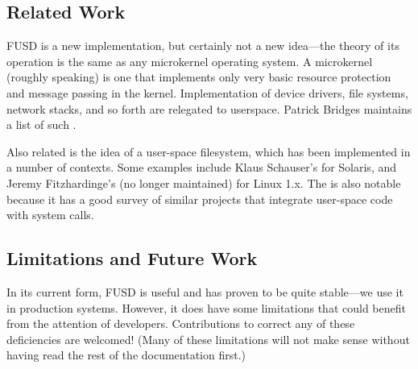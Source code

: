 \documentclass{article}
\begin{document}
\subsection{Related Work}

FUSD is a new implementation, but certainly not a new idea---the
theory of its operation is the same as any microkernel operating
system.  A microkernel (roughly speaking) is one that implements only
very basic resource protection and message passing in the kernel.
Implementation of device drivers, file systems, network stacks, and so
forth are relegated to userspace.  Patrick Bridges maintains a list of
such .

Also related is the idea of a user-space filesystem, which has been
implemented in a number of contexts.  Some examples include Klaus
Schauser's  for Solaris,
and Jeremy Fitzhardinge's (no longer maintained)
for Linux 1.x.  The  is also
notable because it has a good survey of similar projects that
integrate user-space code with system calls.

\subsection{Limitations and Future Work}

In its current form, FUSD is useful and has proven to be quite
stable---we use it in production systems.  However, it does have some
limitations that could benefit from the attention of developers.
Contributions to correct any of these deficiencies are welcomed!
(Many of these limitations will not make sense without having read the
rest of the documentation first.)
\end{document}

